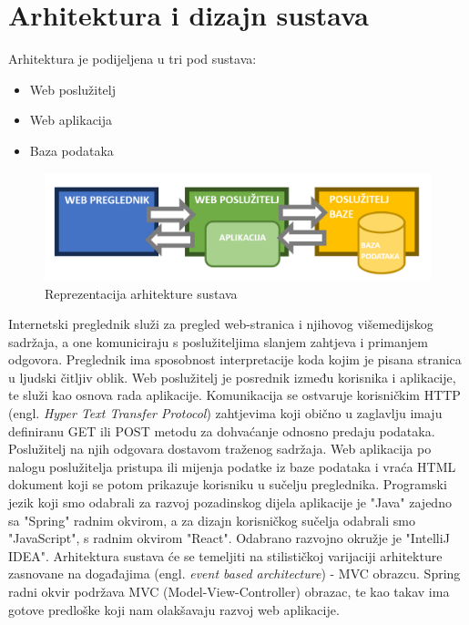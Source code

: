 \chapter{Arhitektura i dizajn sustava}		
Arhitektura je podijeljena u tri pod sustava:

\begin{itemize}
	\item Web poslužitelj
	\item Web aplikacija
	\item Baza podataka
\end{itemize}

\begin{figure}
	\includegraphics[width=\linewidth]{Slike/ArhitekturaSustava}
	\caption{Reprezentacija arhitekture sustava}
\end{figure}

\indent Internetski preglednik služi za pregled web-stranica i njihovog višemedijskog sadržaja, a one komuniciraju s poslužiteljima slanjem zahtjeva i primanjem odgovora. Preglednik ima sposobnost interpretacije koda kojim je pisana stranica u ljudski čitljiv oblik.
\newline
\indent Web poslužitelj je posrednik između korisnika i aplikacije, te služi kao osnova rada aplikacije. Komunikacija se ostvaruje korisničkim HTTP (engl. \textit{Hyper Text Transfer Protocol}) zahtjevima koji obično u zaglavlju imaju definiranu GET ili POST metodu za dohvaćanje odnosno predaju podataka. Poslužitelj na njih odgovara dostavom traženog sadržaja.
\newline
\indent Web aplikacija po nalogu poslužitelja pristupa ili mijenja podatke iz baze podataka i vraća HTML dokument koji se potom prikazuje korisniku u sučelju preglednika.
Programski jezik koji smo odabrali za razvoj pozadinskog dijela aplikacije je "Java" zajedno sa "Spring" radnim okvirom, a za dizajn korisničkog sučelja odabrali smo "JavaScript", s radnim okvirom "React". Odabrano razvojno okružje je "IntelliJ IDEA". Arhitektura sustava će se temeljiti na stilističkoj varijaciji arhitekture zasnovane na događajima (engl. \textit{event based architecture}) - MVC obrazcu. Spring radni okvir podržava MVC (Model-View-Controller) obrazac, te kao takav ima gotove predloške koji nam olakšavaju razvoj web aplikacije.
\newline

